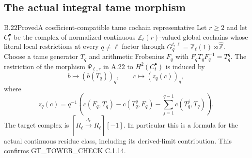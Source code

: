 \subsection{The actual integral tame morphism}

\begin{result}{B.22}{Proved}{A coefficient-compatible tame cochain representative}
\label{coh:tameedge}
Let $r\geq2$ and let $C_t^\bullet$ be the complex of normalized
continuous $\mathbb Z_\ell(r)$-valued global cochains whose literal
local restrictions at every $q\ne\ell$ factor through
$G_q^{t,\ell}=\mathbb Z_\ell(1)\rtimes\widehat{\mathbb Z}$.
Choose a tame generator $T_q$ and arithmetic Frobenius $F_q$ with
$F_qT_qF_q^{-1}=T_q^q$. The restriction of the morphism
$\Psi_{\ell,r}$ in A.22 to $H^2(C_t^\bullet)$ is induced by
\[
 b\longmapsto(b(T_q))_q,\qquad
 c\longmapsto(z_q(c))_q,
\]
where
\[
 z_q(c)=q^{-1}\left(c(F_q,T_q)-c(T_q^q,F_q)
                       -\sum_{j=1}^{q-1}c(T_q^j,T_q)\right).
\]
The target complex is $[R_\ell\xrightarrow{d_r}R_\ell][-1]$.
In particular this is a formula for the actual continuous residue
class, including its derived-limit contribution. This confirms
GT\_TOWER\_CHECK C.1.14.
\end{result}
